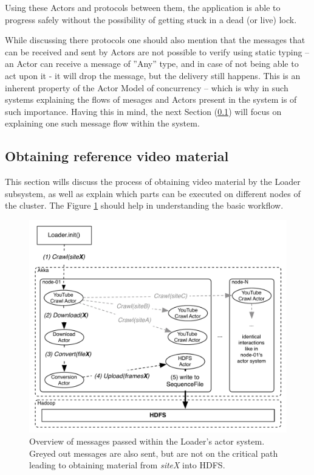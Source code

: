 Using these Actors and protocols between them, the application is able to progress safely without the possibility of getting stuck in a dead (or live) lock. 

While discussing there protocols one should also mention that the messages that can be received and sent by Actors are not possible to verify using static typing -- an Actor can receive a message of ''Any'' type, and in case of not being able to act upon it - it will drop the message, but the delivery still happens.
This is an inherent property of the Actor Model of concurrency -- which is why in such systems explaining the flows of mesages and Actors present in the system is of such importance. Having this in mind, the next Section (\ref{sec:obtaining-reference-material}) will focus on explaining one such message flow within the system.

\subsection{Obtaining reference video material}
\label{sec:obtaining-reference-material}
This section wills discuss the process of obtaining video material by the Loader subsystem, as well as explain which parts can be executed on different nodes of the cluster. The Figure \ref{fig:high-level-loader} should help in understanding the basic workflow.

\begin{figure}[ch!]
  \centering
  \includegraphics[scale=0.9]{./diagrams/loader-high-level.pdf}
  \caption{Overview of messages passed within the Loader's actor system. Greyed out messages are also sent, but are not on the critical path leading to obtaining material from \textit{siteX} into HDFS.}
  \label{fig:high-level-loader}
\end{figure}

